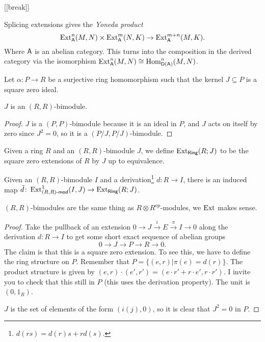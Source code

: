 [[break]]

\begin{remark}
 Splicing extensions gives the \emph{Yoneda product}
 \[
  \operatorname{Ext}^n_{\text{\sf A}}(M,N)\times \operatorname{Ext}^m_{\text{\sf A}}(N,K)\to \operatorname{Ext}^{m+n}_{\text{\sf A}}(M,K).
 \]
 Where $\text{\sf A}$ is an abelian category. This turns into the composition in the derived category via the isomorphism $\operatorname{Ext}^n_{\text{\sf A}}(M,N)\cong \operatorname{Hom}_{\text{\sf D}(\text{\sf A})}^n(M,N)$.
\end{remark}


Let $\alpha\colon P\to R$ be a surjective ring homomorphism such that the kernel $J\subseteq P$ is a square zero ideal.
\begin{lemma}
 $J$ is an $(R,R)$-bimodule.
\end{lemma}
\begin{proof}
 $J$ is a $(P,P)$-bimodule because it is an ideal in $P$, and $J$ acts on itself by zero since $J^2=0$, so it is a $(P/J,P/J)$-bimodule.
\end{proof}
\begin{definition}
 Given a ring $R$ and an $(R,R)$-bimodule $J$, we define $\operatorname{Ext}_{\text{\sf Ring}}(R;J)$ to be the square zero extensions of $R$ by $J$ up to equivalence.
\end{definition}
\begin{lemma}
 Given an $(R,R)$-bimodule $I$ and a derivation\footnote{$d(rs)=d(r)s+rd(s)$.} $d\colon R\to I$, there is an induced map $\tilde d\colon \operatorname{Ext}^1_{(R,R)\textrm{-\sf mod}}(I,J)\to \operatorname{Ext}_{\text{\sf Ring}}(R;J)$.
\end{lemma}
\begin{remark}
 $(R,R)$-bimodules are the same thing as $R\otimes R^{op}$-modules, we $\operatorname{Ext}$ makes sense. 
\end{remark}
\begin{proof}
 Take the pullback of an extension $0\to J\xrightarrow i E\xrightarrow \pi I\to 0$ along the derivation $d\colon R\to I$ to get some short exact sequence of abelian groups
 \[
  0\to J\to P\to R\to 0.
 \]
 The claim is that this is a square zero extension. To see this, we have to define the ring structure on $P$. Remember that $P=\{(e,r)|\pi(e)=d(r)\}$. The product structure is given by $(e,r)\cdot (e',r')=(e\cdot r'+r\cdot e',r\cdot r')$. I invite you to check that this still in $P$ (this uses the derivation property). The unit is $(0,1_R)$.
 
 $J$ is the set of elements of the form $(i(j),0)$, so it is clear that $J^2=0$ in $P$.
\end{proof}
